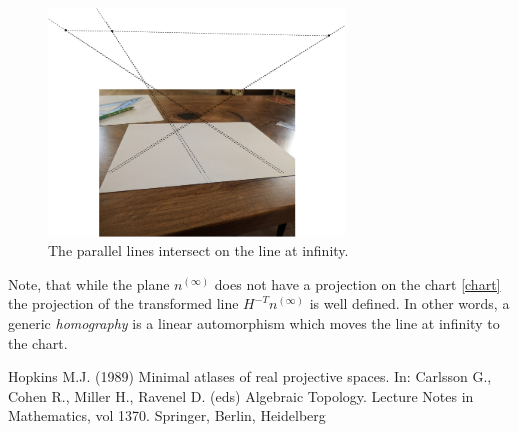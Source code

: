 \documentclass[a4paper,10pt]{article}
\begin{document}
\begin{figure}[h]
\centering
 \includegraphics[width=0.7\textwidth]{../../images/parallel.png}
 \caption{The parallel lines intersect on the line at infinity. }
 \label{fig:drawed}
\end{figure}

Note, that while the plane $n^{(\infty)}$ does not have a projection on the chart \eqref{chart} the projection of the  transformed line $H^{-T}n^{(\infty)}$ is well defined. In other words, a generic {\it homography} is a linear automorphism which moves the line at infinity to the chart. 
\begin{thebibliography}{1}
 Hopkins M.J. (1989) Minimal atlases of real projective spaces. In: Carlsson G., Cohen R., Miller H., Ravenel D. (eds) Algebraic Topology. Lecture Notes in Mathematics, vol 1370. Springer, Berlin, Heidelberg
\end{thebibliography}
\end{document}
